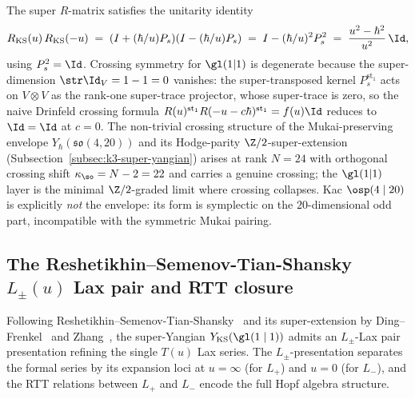 \begin{remark}
\label{rem:ks-unitarity-crossing}
The super $R$-matrix satisfies the unitarity identity
\[
 R_{\mathrm{KS}}(u)\, R_{\mathrm{KS}}(-u)
 \;=\; (I + (\hbar/u) P_s)(I - (\hbar/u) P_s)
 \;=\; I - (\hbar/u)^2 P_s^2
 \;=\; \frac{u^2 - \hbar^2}{u^2}\,\Id,
\]
using $P_s^2 = \Id$. Crossing symmetry for $\gl(1|1)$ is degenerate
because the super-dimension $\str \Id_V = 1 - 1 = 0$ vanishes: the
super-transposed kernel $P_s^{\mathrm{st}_1}$ acts on $V\otimes V$
as the rank-one super-trace projector, whose super-trace is zero,
so the naive Drinfeld crossing formula
$R(u)^{\mathrm{st}_1} R(-u - c\hbar)^{\mathrm{st}_1} = f(u)\Id$
reduces to $\Id = \Id$ at $c = 0$. The non-trivial crossing structure
of the Mukai-preserving envelope $Y_\hbar(\mathfrak{so}(4, 20))$ and
its Hodge-parity $\Z/2$-super-extension
(Subsection~\ref{subsec:k3-super-yangian}) arises at rank $N = 24$
with orthogonal crossing shift $\kappa_{\so} = N - 2 = 22$ and carries
a genuine crossing; the $\gl(1|1)$ layer is the minimal $\Z/2$-graded
limit where crossing collapses. Kac $\osp(4 \mid 20)$ is explicitly
\emph{not} the envelope: its form is symplectic on the
$20$-dimensional odd part, incompatible with the symmetric Mukai
pairing.
\end{remark}

\subsection{The Reshetikhin--Semenov-Tian-Shansky $L_\pm(u)$ Lax pair and RTT closure}
\label{subsec:rsts-lax-pair}

Following Reshetikhin--Semenov-Tian-Shansky~\cite{ReshetikhinSemenovTianShansky1988}
and its super-extension by Ding--Frenkel~\cite{DingFrenkel1993} and
Zhang~\cite{Zhang1995}, the super-Yangian $Y_{\mathrm{KS}}(\gl(1 \mid 1))$
admits an $L_\pm$-Lax pair presentation refining the single $T(u)$
Lax series. The $L_\pm$-presentation separates the formal series by
its expansion loci at $u = \infty$ (for $L_+$) and $u = 0$ (for $L_-$),
and the RTT relations between $L_+$ and $L_-$ encode the full Hopf
algebra structure.

